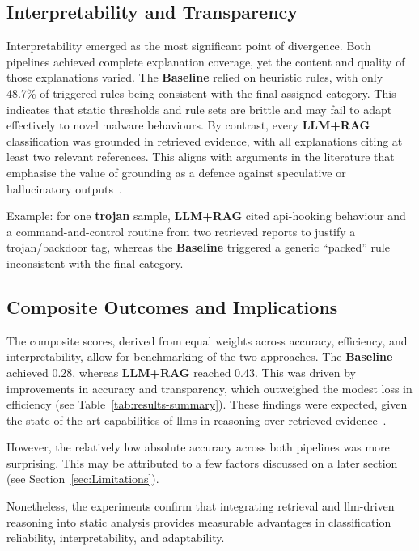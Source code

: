 \subsection{Interpretability and Transparency}
Interpretability emerged as the most significant point of divergence. Both pipelines achieved
complete explanation coverage, yet the content and quality of those explanations varied. The
\textbf{Baseline} relied on heuristic rules, with only 48.7\% of triggered rules being consistent
with the final assigned category. This indicates that static thresholds and rule sets are brittle
and may fail to adapt effectively to novel malware behaviours. By contrast, every \textbf{LLM+RAG}
classification was grounded in retrieved evidence, with all explanations citing at least two
relevant references. This aligns with arguments in the literature that emphasise the value of
grounding as a defence against speculative or hallucinatory outputs~\cite{sahoo2024systematic,
      wong2021practice}.

Example: for one \textbf{trojan} sample, \textbf{LLM+RAG} cited \gls{api}-hooking behaviour and a
command-and-control routine from two retrieved reports to justify a trojan/backdoor tag, whereas
the \textbf{Baseline} triggered a generic ``packed'' rule inconsistent with the final category.

\subsection{Composite Outcomes and Implications}
The composite scores, derived from equal weights across accuracy, efficiency, and interpretability,
allow for benchmarking of the two approaches. The \textbf{Baseline} achieved 0.28, whereas
\textbf{LLM+RAG} reached 0.43. This was driven by improvements in accuracy and transparency, which
outweighed the modest loss in efficiency (see Table~\ref{tab:results-summary}). These findings were
expected, given the state-of-the-art capabilities of \glspl{llm} in reasoning over retrieved
evidence~\cite{nourmohammadzadeh2024llmsurvey, ferrag2024allinsights}.

However, the relatively low absolute accuracy across both pipelines was more surprising. This may
be attributed to a few factors discussed on a later section (see Section~\ref{sec:Limitations}).

Nonetheless, the experiments confirm that integrating retrieval and \gls{llm}-driven reasoning into
static analysis provides measurable advantages in classification reliability, interpretability, and
adaptability.

